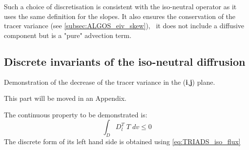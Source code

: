 \documentclass[../main/NEMO_manual]{subfiles}
\begin{document}
Such a choice of discretisation is consistent with the iso-neutral operator as
it uses the same definition for the slopes.
It also ensures the conservation of the tracer variance (see \autoref{subsec:ALGOS_eiv_skew}),
\ie\ it does not include a diffusive component but is a "pure" advection term.

\subsection{Discrete invariants of the iso-neutral diffrusion}
\label{subsec:ALGOS_Gf_operator}

Demonstration of the decrease of the tracer variance in the (\textbf{i},\textbf{j}) plane.

This part will be moved in an Appendix.

The continuous property to be demonstrated is:
\[
  \int_D  D_l^T \; T \;dv   \leq 0
\]
The discrete form of its left hand side is obtained using \autoref{eq:TRIADS_iso_flux}
\end{document}
